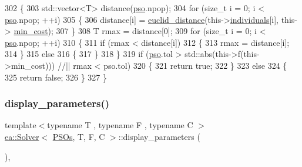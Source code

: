 \begin{DoxyCode}
302     \{
303         std::vector<T> distance(\hyperlink{classea_1_1_solver_3_01_p_s_os_00_01_t_00_01_f_00_01_c_01_4_a1f1aa62756a73565ebe0ca1fbc084ea5}{pso}.npop);
304         \textcolor{keywordflow}{for} (\textcolor{keywordtype}{size\_t} i = 0; i < \hyperlink{classea_1_1_solver_3_01_p_s_os_00_01_t_00_01_f_00_01_c_01_4_a1f1aa62756a73565ebe0ca1fbc084ea5}{pso}.npop; ++i)
305         \{
306             distance[i] = \hyperlink{classea_1_1_solver_3_01_p_s_os_00_01_t_00_01_f_00_01_c_01_4_abb67d82749ba9525e7c8c68f5494389f}{euclid\_distance}(this->\hyperlink{classea_1_1_solver__base_ad75bc440d24a46e97694c7c889f2ecde}{individuals}[i], this->
      \hyperlink{classea_1_1_solver__base_af745cded954be26280d842c1e7c7f989}{min\_cost});
307         \}
308         T rmax = distance[0];
309         \textcolor{keywordflow}{for} (\textcolor{keywordtype}{size\_t} i = 0; i < \hyperlink{classea_1_1_solver_3_01_p_s_os_00_01_t_00_01_f_00_01_c_01_4_a1f1aa62756a73565ebe0ca1fbc084ea5}{pso}.npop; ++i)
310         \{
311             \textcolor{keywordflow}{if} (rmax < distance[i])
312             \{
313                 rmax = distance[i];
314             \}
315             \textcolor{keywordflow}{else}
316             \{
317             \}
318         \}
319         \textcolor{keywordflow}{if} (\hyperlink{classea_1_1_solver_3_01_p_s_os_00_01_t_00_01_f_00_01_c_01_4_a1f1aa62756a73565ebe0ca1fbc084ea5}{pso}.tol > std::abs(this->f(this->min\_cost))) \textcolor{comment}{//|| rmax < pso.tol)}
320         \{
321             \textcolor{keywordflow}{return} \textcolor{keyword}{true};
322         \}
323         \textcolor{keywordflow}{else}
324         \{
325             \textcolor{keywordflow}{return} \textcolor{keyword}{false};
326         \}
327     \}
\end{DoxyCode}
\mbox{\label{classea_1_1_solver_3_01_p_s_os_00_01_t_00_01_f_00_01_c_01_4_afcb113cca952b4954e3639e538d6c5cd}} 
\subsubsection{\texorpdfstring{display\+\_\+parameters()}{display\_parameters()}}
{\footnotesize\ttfamily template$<$typename T , typename F , typename C $>$ \\
\hyperlink{classea_1_1_solver}{ea\+::\+Solver}$<$ \hyperlink{structea_1_1_p_s_os}{P\+S\+Os}, T, F, C $>$\+::display\+\_\+parameters (\begin{DoxyParamCaption}{ }\end{DoxyParamCaption})\hspace{0.3cm}{\ttfamily [inline]}, {\ttfamily [private]}}



